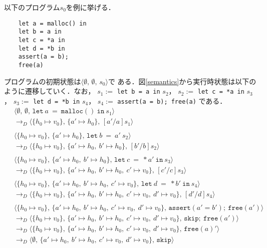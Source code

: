 \begin{example}[操作的意味論]
  \label{semantics_example}
  以下のプログラム$s_{0}$を例に挙げる．
\begin{verbatim}
    let a = malloc() in
    let b = a in
    let c = *a in
    let d = *b in
    assert(a = b);
    free(a)
\end{verbatim}
  プログラムの初期状態は$\langle \emptyset,\,\emptyset,\,s_{0} \rangle$で
  ある．図\ref{semantics}から実行時状態は以下のように遷移していく．なお，
  $s_{1} := $ \verb|let b = a in| $s_2$，
  $s_{2} := $ \verb|let c = *a in| $s_3$，
  $s_{3} := $ \verb|let d = *b in| $s_4$，
  $s_{4} := $ \verb|assert(a = b); free(a)| である．\\
  \small
$
\begin{aligned}
  &\langle \emptyset,\,\emptyset,\,
  \texttt{let}\ a\ = \ \texttt{malloc}()\ \texttt{in}\ s_{1} \rangle \\
  &\longrightarrow_{D}
  \langle \{h_{0} \mapsto v_{0}\},\,\{a' \mapsto h_{0}\},\,
  [a'/a]s_{1} \rangle \\
  \ \\[-10pt]
  &\langle \{h_{0} \mapsto v_{0}\},\,\{a' \mapsto h_{0}\},\,
  \texttt{let}\ b\ =\ a'\ s_{2} \rangle \\
  &\longrightarrow_{D}
  \langle \{h_{0} \mapsto v_{0}\},\,
  \{a' \mapsto h_{0},\ b' \mapsto h_{0}\},\,[b'/b]s_{2} \rangle \\
  \ \\[-10pt]
  &\langle \{h_{0} \mapsto v_{0}\},\,\{a' \mapsto h_{0},\ b' \mapsto h_{0}\},\,
  \texttt{let}\ c\ =\ *a'\ \texttt{in}\ s_{3} \rangle \\
  &\longrightarrow_{D}
  \langle \{h_{0} \mapsto v_{0}\},\,
  \{a' \mapsto h_{0},\ b' \mapsto h_{0},\ c' \mapsto v_{0}\},\,
  [c'/c]s_{3} \rangle \\
  \ \\[-10pt]
  &\langle \{h_{0} \mapsto v_{0}\},\,
  \{a' \mapsto h_{0},\ b' \mapsto h_{0},\ c' \mapsto v_{0}\},\,
  \texttt{let}\ d\ =\ *b'\ \texttt{in}\ s_{4} \rangle \\
  &\longrightarrow_{D}
  \langle \{h_{0} \mapsto v_{0}\},\,
  \{a' \mapsto h_{0},\ b' \mapsto h_{0},\ c' \mapsto v_{0},\ d' \mapsto v_{0}\},\,
  [d'/d]s_{4} \rangle \\
  \ \\[-10pt]
  &\langle \{h_{0} \mapsto v_{0}\},\,
  \{a' \mapsto h_{0},\ b' \mapsto h_{0},\ c' \mapsto v_{0},\ d' \mapsto v_{0}\},\,
  \texttt{assert}(a' = b');\ \texttt{free}(a') \rangle \\
  &\longrightarrow_{D}
  \langle \{h_{0} \mapsto v_{0}\},\,
  \{a' \mapsto h_{0},\ b' \mapsto h_{0},\ c' \mapsto v_{0},\ d' \mapsto v_{0}\},\,
  \texttt{skip};\ \texttt{free}(a') \rangle \\
  &\longrightarrow_{D}
  \langle \{h_{0} \mapsto v_{0}\},\,
  \{a' \mapsto h_{0},\ b' \mapsto h_{0},\ c' \mapsto v_{0},\ d' \mapsto v_{0}\},\,
  \texttt{free}(a)' \rangle \\
  &\longrightarrow_{D}
  \langle \emptyset,\,
  \{a' \mapsto h_{0},\ b' \mapsto h_{0},\ c' \mapsto v_{0},\ d' \mapsto v_{0}\},\,
  \texttt{skip} \rangle
\end{aligned}
$
\end{example}

